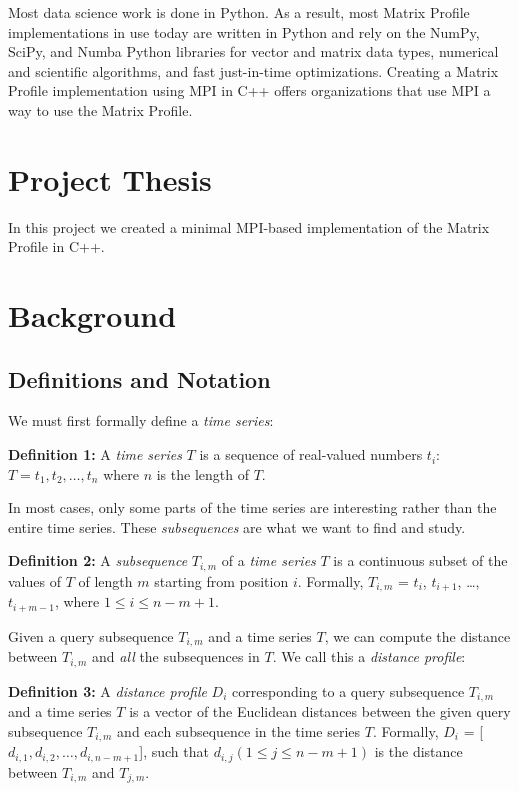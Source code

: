 \documentclass[conference]{IEEEtran}
\begin{document}
Most data science work is done in Python.  As a result, most Matrix Profile implementations in use today are written in Python\cite{Stumpy} and rely on the NumPy, SciPy, and Numba Python libraries for vector and matrix data types, numerical and scientific algorithms, and fast just-in-time optimizations.  Creating a Matrix Profile implementation using MPI in C++ offers organizations that use MPI a way to use the Matrix Profile. 

\section{Project Thesis}
In this project we created a minimal MPI-based implementation of the Matrix Profile in C++.

\section{Background}
\subsection{Definitions and Notation}

We must first formally define a \emph{time series}:


\textbf{Definition 1:} A \emph{time series} $T$ is a sequence of real-valued numbers $t_i$: $T = t_1, t_2, \ldots{}, t_n$ where $n$ is the length of $T$.

In most cases, only some parts of the time series are interesting rather than the entire time series.  These \emph{subsequences} are what we want to find and study.

\textbf{Definition 2:} A \emph{subsequence} $T_{i,m}$ of a \emph{time series} $T$ is a continuous subset of the values of $T$ of length $m$ starting from position $i$.  Formally, $T_{i,m}$ = $t_i$, $t_{i+1}$, \ldots{}, $t_{i+m-1}$, where $1 \leq i \leq n-m+1$.

Given a query subsequence $T_{i,m}$ and a time series $T$, we can compute the distance between $T_{i,m}$ and \emph{all} the subsequences in $T$.  We call this a \emph{distance profile}:

\textbf{Definition 3:} A \emph{distance profile} $D_i$ corresponding to a query subsequence $T_{i,m}$ and a time series $T$ is a vector of the Euclidean distances between the given query subsequence $T_{i,m}$ and each subsequence in the time series $T$.  Formally, $D_i$ = [$d_{i,1}, d_{i,2}, \ldots{}, d_{i,n-m+1}$], such that $d_{i,j}(1 \leq j \leq n-m+1)$ is the distance between $T_{i,m}$ and $T_{j,m}$.
\end{document}
